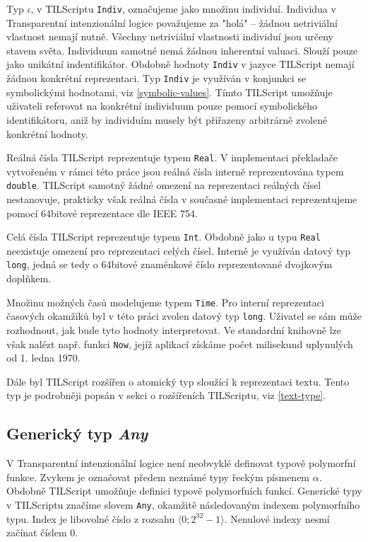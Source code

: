 Typ $\iota$, v TILScriptu \lstinline{Indiv}, označujeme jako množinu individuí. Individua
v Transparentní intenzionální logice považujeme za "holá" -- žádnou netriviální vlastnost nemají
nutně. Všechny netriviální vlastnosti individuí jsou určeny stavem světa. Individuum samotné nemá
žádnou inherentní valuaci. Slouží pouze jako unikátní indentifikátor. Obdobně hodnoty
\lstinline{Indiv} v jazyce TILScript nemají žádnou konkrétní reprezentaci. Typ \lstinline{Indiv}
je využíván v konjunkci se symbolickými hodnotami, viz \ref{symbolic-values}. Tímto TILScript
umožňuje uživateli referovat na konkrétní individuum pouze pomocí symbolického identifikátoru,
aniž by individuím musely být přiřazeny arbitrárně zvolené konkrétní hodnoty.

Reálná čísla TILScript reprezentuje typem \lstinline{Real}. V implementaci překladače vytvořeném
v rámci této práce jsou reálná čísla interně reprezentována typem \lstinline{double}. TILScript
samotný žádné omezení na reprezentaci reálných čísel nestanovuje, prakticky však reálná čísla
v současné implementaci reprezentujeme pomocí 64bitové reprezentace dle IEEE 754.

Celá čísla TILScript reprezentuje typem \lstinline{Int}. Obdobně jako u typu \lstinline{Real}
neexistuje omezení pro reprezentaci celých čísel. Interně je využíván datový typ \lstinline{long},
jedná se tedy o 64bitové znaménkové číslo reprezentované dvojkovým doplňkem.

Množinu možných časů modelujeme typem \lstinline{Time}. Pro interní reprezentaci časových okamžiků
byl v této práci zvolen datový typ \lstinline{long}. Uživatel se sám může rozhodnout, jak bude tyto
hodnoty interpretovat. Ve standardní knihovně lze však nalézt např. funkci \lstinline{Now}, jejíž
aplikací získáme počet milisekund uplynulých od 1. ledna 1970.

Dále byl TILScript rozšířen o atomický typ sloužící k reprezentaci textu. Tento typ je podrobněji
popsán v sekci o rozšířeních TILScriptu, viz \ref{text-type}.

\subsection{Generický typ \textit{Any}}

V Transparentní intenzionální logice není neobvyklé definovat typově polymorfní funkce. Zvykem je
označovat předem neznámé typy řeckým písmenem $\alpha$. Obdobně TILScript umožňuje definici
typově polymorfních funkcí. Generické typy v TILScriptu značíme slovem \lstinline{Any}, okamžitě
následovaným indexem polymorfního typu. Index je libovolné číslo z rozsahu
$\bigl \langle 0; 2^{32}-1 \bigr \rangle$. Nenulové indexy nesmí začínat číslem 0.

